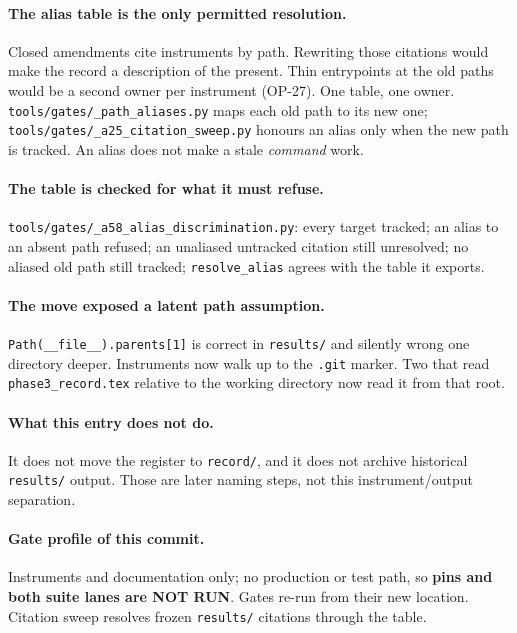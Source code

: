 \documentclass[
  10pt,
]{article}
\begin{document}
\paragraph{The alias table is the only permitted resolution.}
Closed amendments cite instruments by path. Rewriting those citations would
make the record a description of the present. Thin entrypoints at the old paths
would be a second owner per instrument (OP-27). One table, one owner.
\texttt{tools/gates/\_path\_aliases.py} maps each old path to its new one;
\texttt{tools/gates/\_a25\_citation\_sweep.py} honours an alias only when the
new path is tracked. An alias does not make a stale \emph{command} work.

\paragraph{The table is checked for what it must refuse.}
\texttt{tools/gates/\_a58\_alias\_discrimination.py}: every target tracked; an
alias to an absent path refused; an unaliased untracked citation still
unresolved; no aliased old path still tracked; \texttt{resolve\_alias} agrees
with the table it exports.

\paragraph{The move exposed a latent path assumption.}
\texttt{Path(\_\_file\_\_).parents[1]} is correct in \texttt{results/} and
silently wrong one directory deeper. Instruments now walk up to the
\texttt{.git} marker. Two that read \texttt{phase3\_record.tex} relative to the
working directory now read it from that root.

\paragraph{What this entry does not do.}
It does not move the register to \texttt{record/}, and it does not archive
historical \texttt{results/} output. Those are later naming steps, not this
instrument/output separation.

\paragraph{Gate profile of this commit.}
Instruments and documentation only; no production or test path, so
\textbf{pins and both suite lanes are NOT RUN}. Gates re-run from their new
location. Citation sweep resolves frozen \texttt{results/} citations through
the table.
\end{document}
